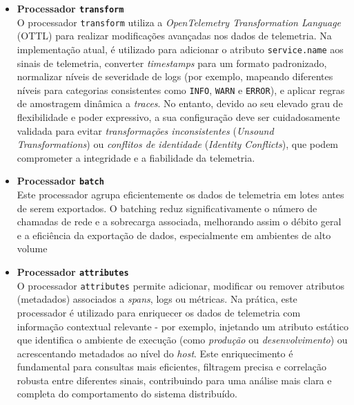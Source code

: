 \begin{itemize}

\item \textbf{Processador \texttt{transform}}\\

O processador \texttt{transform} utiliza a \textit{OpenTelemetry Transformation Language} (OTTL) para realizar modificações avançadas nos dados de telemetria. Na implementação atual, é utilizado para adicionar o atributo \texttt{service.name} aos sinais de telemetria, converter \textit{timestamps} para um formato padronizado, normalizar níveis de severidade de logs (por exemplo, mapeando diferentes níveis para categorias consistentes como \texttt{INFO}, \texttt{WARN} e \texttt{ERROR}), e aplicar regras de amostragem dinâmica a \textit{traces}. No entanto, devido ao seu elevado grau de flexibilidade e poder expressivo, a sua configuração deve ser cuidadosamente validada para evitar \textit{transformações inconsistentes} (\textit{Unsound Transformations}) ou \textit{conflitos de identidade} (\textit{Identity Conflicts}), que podem comprometer a integridade e a fiabilidade da telemetria.

\item \textbf{Processador \texttt{batch}}\\

Este processador agrupa eficientemente os dados de telemetria em lotes antes de serem exportados. O batching reduz significativamente o número de chamadas de rede e a sobrecarga associada, melhorando assim o débito geral e a eficiência da exportação de dados, especialmente em ambientes de alto volume

\item \textbf{Processador \texttt{attributes}}\\

O processador \texttt{attributes} permite adicionar, modificar ou remover atributos (metadados) associados a \textit{spans}, logs ou métricas. Na prática, este processador é utilizado para enriquecer os dados de telemetria com informação contextual relevante - por exemplo, injetando um atributo estático que identifica o ambiente de execução (como \textit{produção} ou \textit{desenvolvimento}) ou acrescentando metadados ao nível do \textit{host}. Este enriquecimento é fundamental para consultas mais eficientes, filtragem precisa e correlação robusta entre diferentes sinais, contribuindo para uma análise mais clara e completa do comportamento do sistema distribuído.


\end{itemize}
